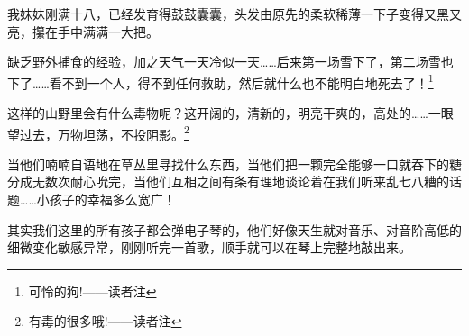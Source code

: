 我妹妹刚满十八，已经发育得鼓鼓囊囊，头发由原先的柔软稀薄一下子变得又黑又亮，攥在手中满满一大把。

缺乏野外捕食的经验，加之天气一天冷似一天……后来第一场雪下了，第二场雪也下了……看不到一个人，得不到任何救助，然后就什么也不能明白地死去了！\footnote{可怜的狗!——读者注}

这样的山野里会有什么毒物呢？这开阔的，清新的，明亮干爽的，高处的……一眼望过去，万物坦荡，不投阴影。\footnote{有毒的很多哦!——读者注}

当他们喃喃自语地在草丛里寻找什么东西，当他们把一颗完全能够一口就吞下的糖分成无数次耐心吮完，当他们互相之间有条有理地谈论着在我们听来乱七八糟的话题……小孩子的幸福多么宽广！

其实我们这里的所有孩子都会弹电子琴的，他们好像天生就对音乐、对音阶高低的细微变化敏感异常，刚刚听完一首歌，顺手就可以在琴上完整地敲出来。